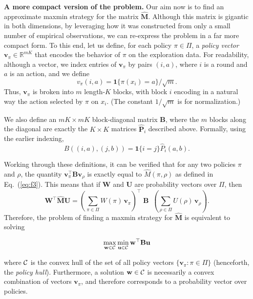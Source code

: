  {\bf A more compact version of the problem.} Our aim now is to find an approximate maxmin strategy for the matrix $\mathbf{\hat{M}}$.
Although this matrix is gigantic in both dimensions, by leveraging how it was constructed from only a small number of empirical observations, we can re-express the problem in a far more compact form. To this end, let us define, for each policy $\pi\in\Pi$,
a {\em policy vector} $\mathbf{v}_\pi\in{\mathbb{R}}^{m K}$ that encodes the behavior of
$\pi$ on the exploration data. For readability, although a vector, we index entries of $\mathbf{v}_\pi$ by pairs $(i,a)$, where $i$ is a round and $a$ is an action, and we define
\[
   {v_\pi({i}, {a})} = \mathbf{1}\{\pi(x_i) = a\}/\sqrt{m}.
\]
Thus, $\mathbf{v}_\pi$ is broken into $m$ length-$K$ blocks, with block $i$ encoding in a natural way the action selected by
$\pi$ on $x_i$. (The constant $1/\sqrt{m}$ is for normalization.)

We also define an $m K \times m K$ block-diagonal matrix $\mathbf{B}$, where the $m$ blocks along the diagonal are exactly the
$K\times K$ matrices
${\mathbf{\hat{P}}_i}$ described above. Formally, using the earlier indexing,
\[
 {B(({i},{a}),({j},{b}))} = \mathbf{1}\{i=j\} {\hat{P}_i({a},{b})}.
\]

Working through these definitions, it can be verified that for any two policies $\pi$ and $\rho$, the quantity
${\mathbf{v}_\pi^{\top}} \mathbf{B} {\mathbf{v}_\rho}$
is exactly equal to ${\hat{M}({\pi},{\rho})}$ as defined in Eq.~(\ref{eq:f3}).
This means that if $\mathbf{W}$ and $\mathbf{U}$ are probability vectors over $\Pi$, then
\[
  {\mathbf{W}^{\top}} \mathbf{\hat{M}} \mathbf{U}
   = \textstyle {{\left({\sum_{\pi\in \Pi} W(\pi)\, \mathbf{v}_\pi}\right)}^{\top}}\; \mathbf{B}\;\;
            {{\left({\sum_{\rho\in \Pi} U(\rho)\, {\mathbf{v}_\rho}}\right)}}.
\]
Therefore, the problem of finding a maxmin strategy for $\mathbf{\hat{M}}$ is equivalent to solving

\begin{equation} \label{eq:f4}
  \max_{\mathbf{w}\in{\cal C}} \min_{\mathbf{u}\in{\cal C}} {\mathbf{w}^{\top}} \mathbf{B} \mathbf{u}
\end{equation}

where ${\cal C}$ is the convex hull of the set of all policy vectors
$\{\mathbf{v}_\pi : \pi\in\Pi\}$ (henceforth, the \emph{policy hull}). Furthermore, a solution $\mathbf{w}\in{\cal C}$ is necessarily a convex combination of vectors $\mathbf{v}_\pi$, and therefore corresponds to a probability vector over policies.


